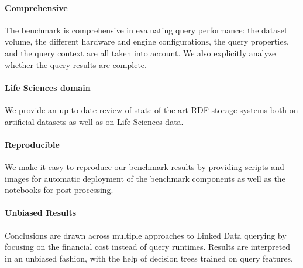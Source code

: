 \paragraph{Comprehensive}
The benchmark is comprehensive in evaluating query performance: the dataset volume, the different hardware and engine configurations, the query properties, and the query context are all taken into account. We also explicitly analyze whether the query results are complete. 

\paragraph{Life Sciences domain}
We provide an up-to-date review of state-of-the-art RDF storage systems both on artificial datasets as well as on Life Sciences data. 


\paragraph{Reproducible}
We make it easy to reproduce our benchmark results by providing scripts and images for automatic deployment of the benchmark components as well as the notebooks for post-processing. 


\paragraph{Unbiased Results}
Conclusions are drawn across multiple approaches to Linked Data querying by focusing on the financial cost instead of query runtimes.
Results are interpreted in an unbiased fashion, with the help of decision trees trained on query features.


